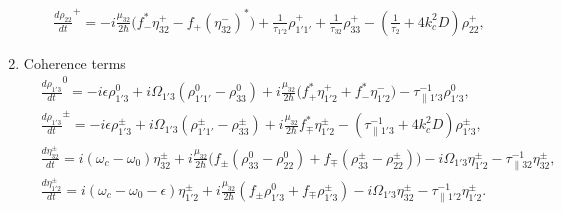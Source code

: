 \documentclass[10pt,letterpaper]{article}
\begin{document}
\begin{enumerate}
{\begin{subequations}
\begin{align}
&\frac{d \rho_{22}}{d t}^{+}   = - i\frac{\mu_{32}}{2\hbar}\big ( f_{-}^*\eta_{32}^{+}-f_{+}(\eta_{32}^{-})^* \big )  + \frac{1}{\tau_{1'2}}\rho_{1'1'}^+  +  \frac{1}{\tau_{32}}\rho_{33}^+ - (\frac{1}{\tau_{2}}+4k_c^2D) \rho_{22}^+ , \label{eq:rtpop2grating}
\end{align}
\end{subequations}}
\item {Coherence terms
\begin{subequations}
\label{eq:coherencesdm}
\begin{align}
&\frac{d \rho_{1'3}}{d t}^0  = -i\epsilon\rho_{1'3}^0 +i \Omega_{1'3}(\rho_{1'1'}^{0} - \rho_{33}^{0}) +i\frac{\mu_{32}}{2 \hbar}\big (f_{+}^*\eta_{1'2}^{+}+f_{-}^*\eta_{1'2}^{-} \big ) -
\tau_{\parallel 1'3}^{-1} \rho_{1'3}^{0} ,  \\
&\frac{d \rho_{1'3}}{d t} ^\pm = -i\epsilon\rho_{1'3}^\pm  +i\Omega_{1'3}(\rho_{1'1'}^{\pm} - \rho_{33}^{\pm}) +i \frac{\mu_{32}}{2 \hbar} f_{\mp}^* \eta_{1'2}^{\pm} 
- (\tau_{\parallel 1'3}^{-1} +4k_c^2 D)\rho_{1'3}^{\pm} ,\label{eq:rho13grating}\\
&\frac{d \eta_{32}^{\pm}}{d t}   = i(\omega_c - \omega_{0})\eta_{32}^{\pm} +i \frac{\mu_{32}}{2\hbar}\Big(  f_{\pm}(\rho_{33}^0-\rho_{22}^0) + f_{\mp}(\rho_{33}^\pm-\rho_{22}^\pm) \Big ) - i\Omega_{1'3}\eta_{1'2}^{\pm}
- \tau_{\parallel 32}^{-1}\eta_{32}^\pm , \\
&\frac{d \eta_{1'2}^\pm}{d t}  = i(\omega_c - \omega_{0}-\epsilon)\eta_{1'2}^{\pm} +i \frac{\mu_{32}}{2\hbar}(f_{\pm }\rho_{1'3}^0 + f_{\mp} \rho_{1'3}^{\pm}) - i\Omega_{1'3}\eta_{32}^{\pm} - \tau_{\parallel 1'2}^{-1}\eta_{1'2}^\pm.\label{eq:rho12-dm}
\end{align}
\end{subequations}}
\end{enumerate}
\end{document}
